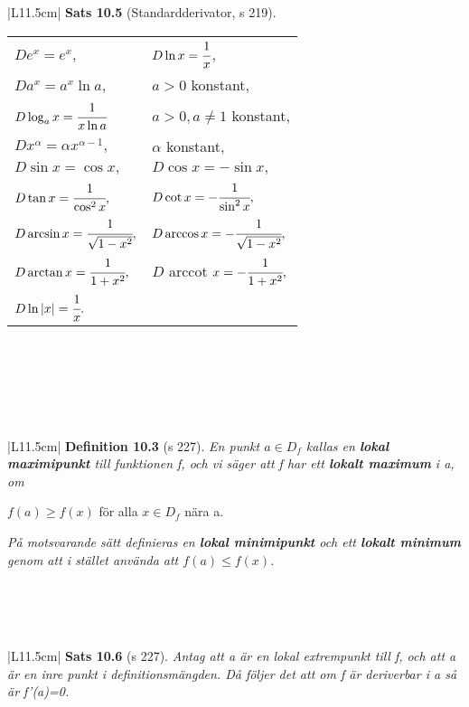 \documentclass[a4paper]{article}
\begin{document}
\begin{tabular}{|L{11.5cm}|} \hline
\textbf{Sats 10.5} (Standardderivator, s 219).
\begin{center}
\begin{tabular}{ll}
$De^x=e^x$,&
$D\ln{x}=\cfrac{1}{x}$,\\
$Da^x=a^x\ln{a}$, & $a>0$ konstant,\\
$D\log_ax=\cfrac{1}{x\ln{a}}$ & $a>0, a\neq 1$ konstant,\\
$Dx^\alpha=\alpha x^{\alpha - 1},$ & $\alpha$ konstant,\\
$D\sin{x}=\cos x,$ &
$D\cos x = -\sin x,$ \\\vspace{0.2cm}
$D\tan x = \cfrac{1}{\cos ^2x},$&
$D\cot x = -\cfrac{1}{\sin ^2x},$\\\vspace{0.2cm}
$D\arcsin x = \cfrac{1}{\sqrt{1-x^2}},$&
$D\arccos x = -\cfrac{1}{\sqrt{1-x^2}},$\\\vspace{0.2cm}
$D\arctan x = \cfrac{1}{1+x^2},$&
$D$ arccot $ x = -\cfrac{1}{1+x^2},$\\ $D\ln{|x|} = \cfrac{1}{x}.$
\end{tabular}
\end{center}
\\\hline
\end{tabular}
\\\\\\
\begin{tabular}{|L{11.5cm}|} \hline
\textbf{Definition 10.3} (s 227).
\textit{En punkt $a\in D_f$ kallas en \textbf{lokal maximipunkt} till funktionen f, och vi säger att f har ett \textbf{lokalt maximum} i a, om}
\begin{center}
$f(a)\geq f(x)$ \hspace{0.5cm} för alla $x\in D_f$ nära a.
\end{center}
\textit{På motsvarande sätt definieras en \textbf{lokal minimipunkt} och ett \textbf{lokalt minimum} genom att i stället använda att $f(a)\leq f(x)$.}
\\\hline
\end{tabular}
\\\\\\
\begin{tabular}{|L{11.5cm}|} \hline
\textbf{Sats 10.6} (s 227).
\textit{Antag att a är en lokal extrempunkt till f, och att a är en inre punkt i definitionsmängden. Då följer det att om f är deriverbar i a så är f'(a)=0.}
\\\hline
\end{tabular}
\end{document}
